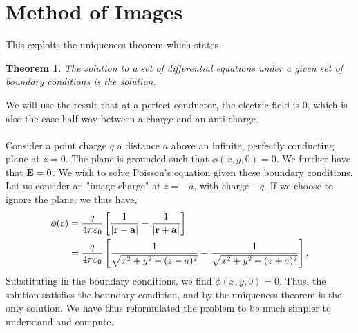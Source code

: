 \documentclass{book}
\newtheorem*{theorem}{Theorem}
\begin{document}
\section{Method of Images}
This exploits the uniqueness theorem which states,
\begin{theorem}
	The solution to a set of differential equations under a given set of boundary conditions is the solution.
\end{theorem}
We will use the result that at a perfect conductor, the electric field is 0, which is also the case half-way between a charge and an anti-charge.
\\\\
Consider a point charge $q$ a distance $a$ above an infinite, perfectly conducting plane at $z = 0$. The plane is grounded such that $\phi(x,y,0) = 0$. We further have that $\vb{E} = 0$. We wish to solve Poisson's equation given these boundary conditions. Let us consider an "image charge" at $z = -a$, with charge $-q$. If we choose to ignore the plane, we thus have,
\begin{equation}
	\begin{split}
	\phi(\vb{r}) & = \frac{q}{4\pi\varepsilon_0}\left[\frac{1}{|\vb{r}-\vb{a}|} - \frac{1}{|\vb{r} + \vb{a}|}\right] \\
	& = \frac{q}{4\pi\varepsilon_0} \left[\frac{1}{\sqrt{x^2 + y^2 + (z-a)^2}}- \frac{1}{\sqrt{x^2 + y^2 + (z+a)^2}}\right].
	\end{split}
\end{equation} 
Substituting in the boundary conditions, we find $\phi(x,y,0) = 0$. Thus, the solution satisfies the boundary condition, and by the uniqueness theorem is the only solution. We have thus reformulated the problem to be much simpler to understand and compute.
\end{document}
